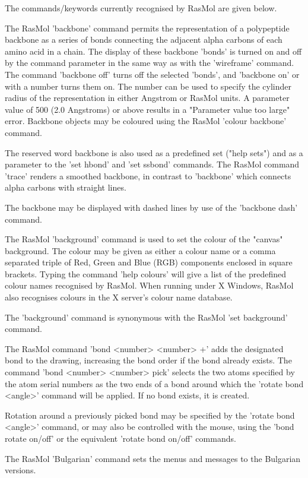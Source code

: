 The commands/keywords currently recognised by RasMol are given below.

The RasMol
'backbone'
command permits the representation of a polypeptide
backbone as a series of bonds connecting the adjacent alpha carbons of
each amino acid in a chain. The display of these backbone 'bonds' is
turned on and off by the command parameter in the same way as with the
'wireframe'
command. The command
'backbone off'
turns off the selected 'bonds', and
'backbone on'
or with a number turns them on. The number can be used
to specify the cylinder radius of the representation in either Angstrom
or RasMol units. A parameter value of 500 (2.0 Angstroms) or above
results in a "Parameter value too large" error. Backbone objects may be
coloured using the RasMol
'colour backbone'
command.

The reserved word backbone is also used as a predefined set ("help sets")
and as a parameter to the
'set hbond'
and
'set ssbond'
commands. The
RasMol command
'trace'
renders a smoothed backbone, in contrast to
'backbone'
which connects alpha carbons with straight lines.

The backbone may be displayed with dashed lines by use of the
'backbone dash'
command.

The RasMol
'background'
command is used to set the colour of the "canvas" background. The
colour may be given as either a colour name or a comma separated
triple of Red, Green and Blue (RGB) components enclosed in square
brackets. Typing the command
'help colours'
will give a list of the predefined colour names recognised by RasMol.
When running under X Windows, RasMol also recognises colours in the
X server's colour name database.

The
'background'
command is synonymous with the RasMol
'set background'
command.

The RasMol command
'bond <number> <number> +'
adds the designated bond to the drawing, increasing the bond order
if the bond already exists.  The command
'bond <number> <number> pick'
selects the two atoms specified by the atom serial numbers
as the two ends of a bond around which the
'rotate bond <angle>'
command will be applied.  If no bond exists, it is created.

Rotation around a previously picked bond may be specified by the
'rotate bond <angle>'
command, or may also be controlled with the mouse, using the
'bond rotate on/off'
or the equivalent
'rotate bond on/off'
commands.

The RasMol
'Bulgarian'
command sets the menus and messages to the Bulgarian versions.

